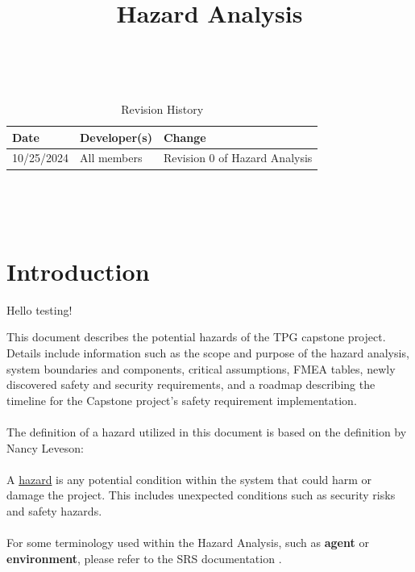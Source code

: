\documentclass{article}
\title{Hazard Analysis\\\progname}
\author{\authname}
\date{}
\begin{document}
\maketitle
\thispagestyle{empty}

~\newpage


\begin{table}[hp]
\caption{Revision History} \label{TblRevisionHistory}
\begin{tabularx}{\textwidth}{llX}
\toprule
\textbf{Date} & \textbf{Developer(s)} & \textbf{Change}\\
\midrule
10/25/2024 & All members & Revision 0 of Hazard Analysis\\
\bottomrule
\end{tabularx}
\end{table}

~\newpage

\tableofcontents

~\newpage



\section{Introduction}

Hello testing!


This document describes the potential hazards of the TPG capstone project. Details include information such as the scope and purpose of the hazard analysis, system boundaries and components, critical assumptions, FMEA tables, newly discovered safety and security requirements, and a roadmap describing the timeline for the Capstone project’s safety requirement implementation. 
\\\\
The definition of a hazard utilized in this document is based on the definition by Nancy Leveson: 
\\\\
A \underline{hazard} is any potential condition within the system that could harm or damage the project. This includes unexpected conditions such as security risks and safety hazards. 
\\\\
For some terminology used within the Hazard Analysis, such as \textbf{agent} or \textbf{environment}, please refer to the SRS documentation \citep{SRS}.
\end{document}
